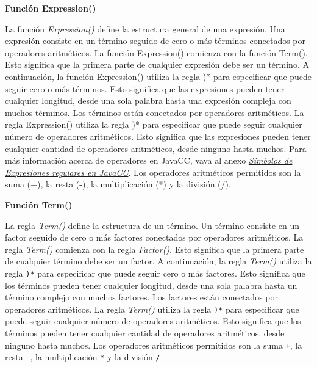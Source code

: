 \phantom{text}

\noindent \textbf{Función Expression()}

\phantom{text}

\lstset{inputencoding=utf8/latin1}


\noindent La función \textit{Expression()} define la estructura general de una expresión. Una expresión consiste en un término seguido de cero o más términos conectados por operadores aritméticos. La función Expression() comienza con la función Term(). Esto significa que la primera parte de cualquier expresión debe ser un término. A continuación, la función Expression() utiliza la regla )* para especificar que puede seguir cero o más términos. Esto significa que las expresiones pueden tener cualquier longitud, desde una sola palabra hasta una expresión compleja con muchos términos.
Los términos están conectados por operadores aritméticos. La regla Expression() utiliza la regla )* para especificar que puede seguir cualquier número de operadores aritméticos. Esto significa que las expresiones pueden tener cualquier cantidad de operadores aritméticos, desde ninguno hasta muchos. Para más información acerca de operadores en JavaCC, vaya al anexo \hyperref[sec:simbolosdeexpresionesregulares]{\textit{Símbolos de Expresiones regulares en JavaCC}}.
Los operadores aritméticos permitidos son la suma (+), la resta (-), la multiplicación (*) y la división (/).

\phantom{text}

\noindent \textbf{Función Term()}

\phantom{text}

\lstset{inputencoding=utf8/latin1}


\noindent La regla \textit{Term()} define la estructura de un término. Un término consiste en un factor seguido de cero o más factores conectados por operadores aritméticos. La regla \textit{Term()} comienza con la regla \textit{Factor()}. Esto significa que la primera parte de cualquier término debe ser un factor. A continuación, la regla \textit{Term()} utiliza la regla \lstinline|)*| para especificar que puede seguir cero o más factores. Esto significa que los términos pueden tener cualquier longitud, desde una sola palabra hasta un término complejo con muchos factores.
Los factores están conectados por operadores aritméticos. La regla \textit{Term()} utiliza la regla \lstinline|)*| para especificar que puede seguir cualquier número de operadores aritméticos. Esto significa que los términos pueden tener cualquier cantidad de operadores aritméticos, desde ninguno hasta muchos.
Los operadores aritméticos permitidos son la suma \lstinline|+|, la resta \lstinline|-|, la multiplicación \lstinline|*| y la división \lstinline|/|

